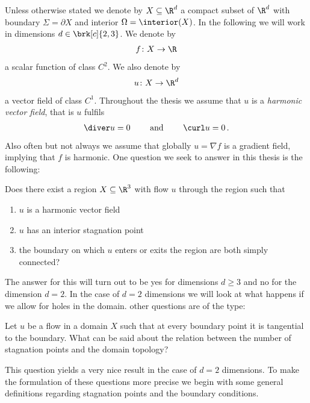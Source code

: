 Unless otherwise stated we denote by $X\subseteq\R^d$ a compact subset of $\R^d$ with boundary $\Sigma=\partial X$ and interior
$\Omega=\interior(X)$.
In the following we will work in dimensions $d\in\brk[c]{2,3}$.
We denote by
\begin{align*}
  f\colon X\to\R
\end{align*}
a scalar function of class $C^2$.
We also denote by
\begin{align*}
  u\colon X\to\R^d
\end{align*}
a vector field of class $C^1$.
Throughout the thesis we assume that $u$ is a 
\emph{harmonic vector field}, that is $u$ fulfils
\begin{align*}
  \diver u=0 \qquad \text{ and }\qquad \curl u=0\,.
\end{align*}
Also often but not always we assume that globally $u=\nabla f$ is a gradient field, implying that $f$ is harmonic.
One question we seek to answer in this thesis is the following:
\begin{question}\label{qu:flowthroughStagnationPoint}
  Does there exist a region $X\subseteq\R^3$ with flow $u$ through the region such that
  \begin{enumerate}
    \item $u$ is a harmonic vector field
    \item $u$ has an interior stagnation point
    \item the boundary on which $u$ enters or exits the region are both simply connected?
  \end{enumerate}
\end{question}
The answer for this will turn out to be yes for dimensions $d\geq3$ and no for the dimension $d=2$.
In the case of $d=2$ dimensions we will look at what happens if we allow for holes in the domain.
other questions are of the type:
\begin{question}
  Let $u$ be a flow in a domain $X$ such that at every boundary point it is tangential to the boundary.
  What can be said about the relation between the number of stagnation points and the domain topology?
\end{question}
This question yields a very nice result in the case of $d=2$ dimensions.
To make the formulation of these questions more precise we begin with some general definitions regarding stagnation points and the boundary conditions.



